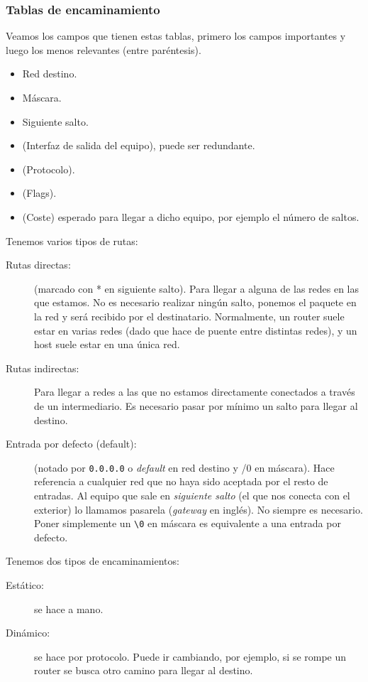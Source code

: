 \subsubsection{Tablas de encaminamiento}
Veamos los campos que tienen estas tablas, primero los campos importantes y luego los menos relevantes (entre paréntesis).
\begin{itemize}
    \item Red destino. 
    \item Máscara.
    \item Siguiente salto. 
    \item (Interfaz de salida del equipo), puede ser redundante. 
    \item (Protocolo).
    \item (Flags).
    \item (Coste) esperado para llegar a dicho equipo, por ejemplo el número de saltos. 
\end{itemize}

Tenemos varios tipos de rutas:
\begin{description}
    \item [Rutas directas:] (marcado con * en siguiente salto). Para llegar a alguna de las redes en las que estamos. No es necesario realizar ningún salto, ponemos el paquete en la red y será recibido por el destinatario. Normalmente, un router suele estar en varias redes (dado que hace de puente entre distintas redes), y un host suele estar en una única red. 
    \item [Rutas indirectas:] Para llegar a redes a las que no estamos directamente conectados a través de un intermediario. Es necesario pasar por mínimo un salto para llegar al destino.  
    \item [Entrada por defecto (default):] (notado por \verb|0.0.0.0| o \textit{default} en red destino y /0 en máscara). Hace referencia a cualquier red que no haya sido aceptada por el resto de entradas. Al equipo que sale en \textit{siguiente salto} (el que nos conecta con el exterior) lo llamamos pasarela (\textit{gateway} en inglés). No siempre es necesario. Poner simplemente un \verb|\0| en máscara es equivalente a una entrada por defecto.
\end{description}

\noindent
Tenemos dos tipos de encaminamientos:
\begin{description}
    \item [Estático:] se hace a mano.
    \item [Dinámico:] se hace por protocolo. Puede ir cambiando, por ejemplo, si se rompe un router se busca otro camino para llegar al destino.
\end{description}

